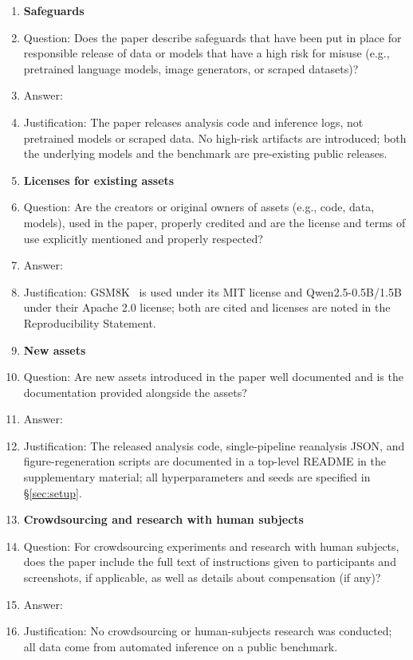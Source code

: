 \documentclass{article}
\begin{document}
\begin{enumerate}
\item {\bf Safeguards}
    \item[] Question: Does the paper describe safeguards that have been put in place for responsible release of data or models that have a high risk for misuse (e.g., pretrained language models, image generators, or scraped datasets)?
    \item[] Answer: \answerNA{}
    \item[] Justification: The paper releases analysis code and inference logs, not pretrained models or scraped data. No high-risk artifacts are introduced; both the underlying models and the benchmark are pre-existing public releases.

\item {\bf Licenses for existing assets}
    \item[] Question: Are the creators or original owners of assets (e.g., code, data, models), used in the paper, properly credited and are the license and terms of use explicitly mentioned and properly respected?
    \item[] Answer: \answerYes{}
    \item[] Justification: GSM8K~\citep{cobbe2021gsm8k} is used under its MIT license and Qwen2.5-0.5B/1.5B under their Apache 2.0 license; both are cited and licenses are noted in the Reproducibility Statement.

\item {\bf New assets}
    \item[] Question: Are new assets introduced in the paper well documented and is the documentation provided alongside the assets?
    \item[] Answer: \answerYes{}
    \item[] Justification: The released analysis code, single-pipeline reanalysis JSON, and figure-regeneration scripts are documented in a top-level README in the supplementary material; all hyperparameters and seeds are specified in \S\ref{sec:setup}.

\item {\bf Crowdsourcing and research with human subjects}
    \item[] Question: For crowdsourcing experiments and research with human subjects, does the paper include the full text of instructions given to participants and screenshots, if applicable, as well as details about compensation (if any)?
    \item[] Answer: \answerNA{}
    \item[] Justification: No crowdsourcing or human-subjects research was conducted; all data come from automated inference on a public benchmark.


\end{enumerate}
\end{document}
